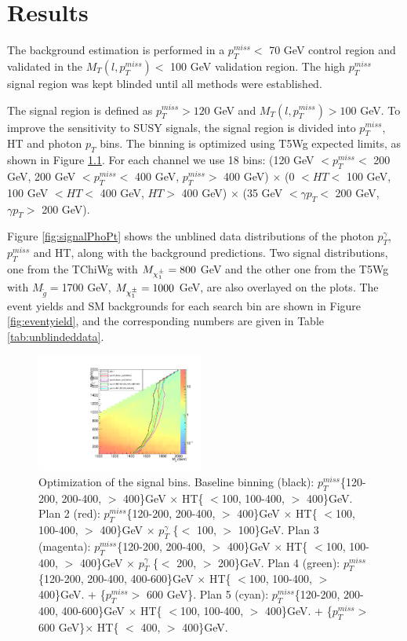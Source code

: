 \documentclass[thesis.tex]{subfiles}
\renewcommand\_{\textunderscore\allowbreak}
\begin{document}
\chapter{Results}
\label{sec:results}
The background estimation is performed in a $p_T^{miss} < $ 70 GeV control region and validated in the $M_T(l, p_T^{miss}) < $ 100 GeV validation region. The high $p_T^{miss}$ signal region was kept blinded until all methods were established.

The signal region is defined as $p_T^{miss} > 120$ GeV and $M_T(l, p_T^{miss}) > 100$ GeV. To improve the sensitivity to SUSY signals, the signal region is divided into $p_T^{miss}$, HT and photon $p_T$ bins. The binning is optimized using T5Wg expected limits, as shown in Figure \ref{fig:optbin}. For each channel we use 18 bins: (120 GeV $< p_T^{miss} <$ 200 GeV, 200 GeV $< p_T^{miss} <$ 400 GeV, $ p_T^{miss} >$ 400 GeV) $\times$ (0 $< HT <$ 100 GeV, 100 GeV $< HT <$ 400 GeV, $HT >$ 400 GeV) $\times$ (35 GeV $< \gamma p_T < $ 200 GeV, $\gamma p_T > $ 200 GeV).

Figure \ref{fig:signalPhoPt} shows the unblined data distributions of the photon $p_T^{\gamma}$, $p_T^{miss}$ and HT, along with the background predictions. Two signal distributions, one from the TChiWg with $M_{\chi_1^\pm} = 800$ GeV and the other one from the T5Wg with $M_{\tilde{g}} = $1700 GeV, $M_{\chi_1^\pm} = 1000$ GeV, are also overlayed on the plots. The event yields and SM backgrounds for each search bin are shown in Figure \ref{fig:eventyield}, and the corresponding numbers are given in Table \ref{tab:unblindeddata}. 

\begin{figure}
  \centering
    \includegraphics[width=0.49\textwidth]{Figures/binningOpt.pdf}
		\caption{Optimization of the signal bins. Baseline binning (black): $p_T^{miss}$\{120-200, 200-400, $ >$ 400\}GeV $\times$ HT\{ $<$100, 100-400, $ >$ 400\}GeV. Plan 2 (red): $p_T^{miss}$\{120-200, 200-400, $ >$ 400\}GeV $\times$ HT\{ $<$100, 100-400, $ >$ 400\}GeV $\times$ $p_T^\gamma$ \{$<$ 100, $>$ 100\}GeV. Plan 3 (magenta): $p_T^{miss}$\{120-200, 200-400, $ >$ 400\}GeV $\times$ HT\{ $<$100, 100-400, $ >$ 400\}GeV $\times$ $p_T^\gamma$ \{$<$ 200, $>$ 200\}GeV. Plan 4 (green): $p_T^{miss}$\{120-200, 200-400, 400-600\}GeV $\times$ HT\{ $<$100, 100-400, $ >$ 400\}GeV. + \{$p_T^{miss} > $ 600 GeV\}. Plan 5 (cyan): $p_T^{miss}$\{120-200, 200-400, 400-600\}GeV $\times$ HT\{ $<$100, 100-400, $ >$ 400\}GeV. + \{$p_T^{miss} > $ 600 GeV\}$\times$ HT\{ $<$ 400, $ >$ 400\}GeV. }
    \label{fig:optbin}
\end{figure}
\end{document}
